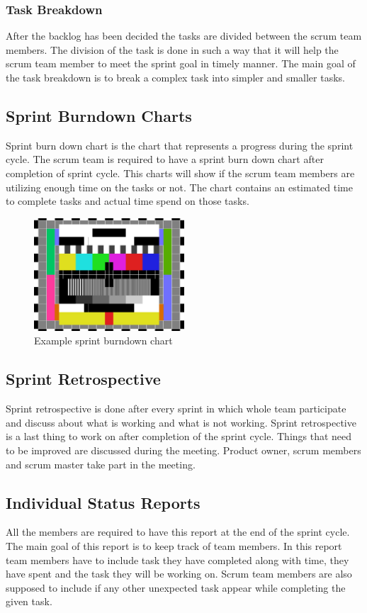 \subsubsection{Task Breakdown}
After the backlog has been decided the tasks are divided between the scrum team members. The division of the task is done in such a way that it will help the scrum team member to meet the sprint goal in timely manner. The main goal of the task breakdown is to break a complex task into simpler and smaller tasks.

\subsection{Sprint Burndown Charts}
Sprint burn down chart is the chart that represents a progress during the sprint cycle. The scrum team is required to have a sprint burn down chart after completion of sprint cycle. This charts will show if the scrum team members are utilizing enough time on the tasks or not. The chart contains an estimated time to complete tasks and actual time spend on those tasks.

\begin{figure}[h!]
    \centering
    \includegraphics[width=0.5\textwidth]{images/test_image}
    \caption{Example sprint burndown chart}
\end{figure}

\subsection{Sprint Retrospective}
Sprint retrospective is done after every sprint in which whole team participate and discuss about what is working and what is not working. Sprint retrospective is a last thing to work on after completion of the sprint cycle. Things that need to be improved are discussed during the meeting. Product owner, scrum members and scrum master take part in the meeting. 

\subsection{Individual Status Reports}
All the members are required to have this report at the end of the sprint cycle. The main goal of this report is to keep track of team members. In this report team members have to include task they have completed along with time, they have spent and the task they will be working on. Scrum team members are also supposed to include if any other unexpected task appear while completing the given task.

